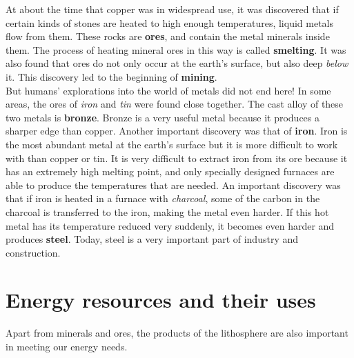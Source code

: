 At about the time that copper was in widespread use, it was discovered that if certain kinds of stones are heated to high enough temperatures, liquid metals flow from them. These rocks are \textbf{ores}, and contain the metal minerals inside them. The process of heating mineral ores in this way is called \textbf{smelting}. It was also found that ores do not only occur at the earth's surface, but also deep \textit{below} it. This discovery led to the beginning of \textbf{mining}.\\

But humans' explorations into the world of metals did not end here! In some areas, the ores of \textit{iron} and \textit{tin} were found close together. The cast alloy of these two metals is \textbf{bronze}. Bronze is a very useful metal because it produces a sharper edge than copper. Another important discovery was that of \textbf{iron}. Iron is the most abundant metal at the earth's surface but it is more difficult to work with than copper or tin. It is very difficult to extract iron from its ore because it has an extremely high melting point, and only specially designed furnaces are able to produce the temperatures that are needed. An important discovery was that if iron is heated in a furnace with \textit{charcoal}, some of the carbon in the charcoal is transferred to the iron, making the metal even harder. If this hot metal has its temperature reduced very suddenly, it becomes even harder and produces \textbf{steel}. Today, steel is a very important part of industry and construction.






\section{Energy resources and their uses}
\label{sec:mining:energy}

Apart from minerals and ores, the products of the lithosphere are also important in meeting our energy needs.\\

